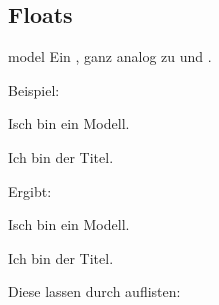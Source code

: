\documentclass{sopra-base}
\begin{document}
\subsection{Floats}

\begin{environment}{model}{}
    Ein , ganz analog zu  und .
\end{environment}

Beispiel:
\begin{plainlatex}[morekeywords={[3]{model}}]
    \begin{model}
        \centering
        Isch bin ein Modell.
        \caption[Und ich eigentlich kürzer.]{Ich bin der Titel.}
    \end{model}
\end{plainlatex}
Ergibt:
\begin{model}
    \centering
    Isch bin ein Modell.
    \caption[Und ich eigentlich kürzer.]{Ich bin der Titel.}
\end{model}

Diese lassen durch  auflisten:

\listofmodel
\end{document}
